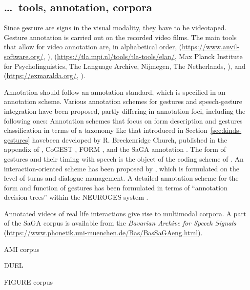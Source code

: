 \documentclass[output=paper]{langsci/langscibook}
\begin{document}
\subsection{\ldots\ tools, annotation, corpora}

Since gesture are signs in the visual modality, they have to be videotaped.
%
Gesture annotation is carried out on the recorded video films.
%
The main tools that allow for video annotation are, in alphabetical order,  (\url{https://www.anvil-software.org/}, \citealp{Kipp:2014}),  (\url{https://tla.mpi.nl/tools/tla-tools/elan/}, Max Planck Institute for Psycholinguistics, The Language Archive, Nijmegen, The Netherlands, \citealp{Sloetjes:Wittenburg:2008}), and  (\url{https://exmaralda.org/}, \citealp{Schmidt:2012}).

Annotation should follow an annotation standard, which is specified in an annotation scheme.
%
Various annotation schemes for gestures and speech-gesture integration have been proposed, partly differing in annotation foci, including the following ones:
%
Annotation schemes that focus on form description and gestures classification in terms of a taxonomy like that introduced in Section~\ref{sec:kinds-gestures} havebeen developed by R. Breckenridge Church, published in the appendix of \citet{McNeill:1992}, CoGEST \citep{Gibbon:et:al:2003}, FORM \citep{Martell:Osborn:Friedman:Howard:2002}, and the SaGA annotation \citep{Luecking:Bergmann:Hahn:Kopp:Rieser:2013}.
%
The form of gestures and their timing with speech is the object of the coding scheme of \citet{Kipp:Neff:Albrecht:2007}.
%
An interaction-oriented scheme has been proposed by \citet{Allwood:et:al:2007}, which is formulated on the level of turns and dialogue management.
%
A detailed annotation scheme for the form and function of gestures has been formulated in terms of \enquote{annotation decision trees} within the NEUROGES system \citep{Lausberg:Sloetjes:2009}.


Annotated videos of real life interactions give rise to multimodal corpora. 
%
A part of the SaGA corpus is available from the \textit{Bavarian Archive for Speech Signals} (\url{https://www.phonetik.uni-muenchen.de/Bas/BasSaGAeng.html}).

AMI corpus \citep{Carletta:et:al:2006}

DUEL \citep{Hough:Tian:de:Ruiter:Betz:Kousidis:Schlangen:Ginzburg:2016}

FIGURE corpus \citep{Luecking:Mehler:Walther:Mauri:Kurfuerst:2016}
\end{document}
